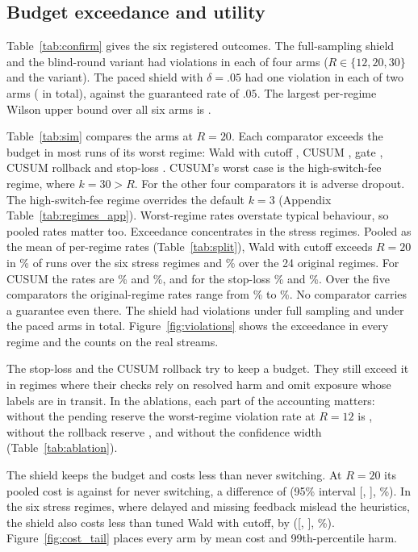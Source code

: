 \documentclass[10pt]{article}
\theoremstyle{plain}
\theoremstyle{definition}
\begin{document}
\subsection{Budget exceedance and utility}
Table~\ref{tab:confirm} gives the six registered outcomes. The full-sampling shield and the blind-round variant had \COneTotal{} violations in each of four arms ($R\in\{12,20,30\}$ and the variant). The paced shield with $\delta=.05$ had one violation in each of two arms (\CTwoTotal{} in total), against the guaranteed rate of $.05$. The largest per-regime Wilson upper bound over all six arms is \CTwoMaxHi.

Table~\ref{tab:sim} compares the arms at $R=20$. Each comparator exceeds the budget in most runs of its worst regime: Wald with cutoff \WorstWald, CUSUM \WorstCusum, gate \WorstGate, CUSUM rollback \WorstCusumRb and stop-loss \WorstStop. CUSUM's worst case is the high-switch-fee regime, where $k=30>R$. For the other four comparators it is adverse dropout. The high-switch-fee regime overrides the default $k=3$ (Appendix Table~\ref{tab:regimes_app}).
Worst-regime rates overstate typical behaviour, so pooled rates matter too. Exceedance concentrates in the stress regimes. Pooled as the mean of per-regime rates (Table~\ref{tab:split}), Wald with cutoff exceeds $R=20$ in \StressExceedWald\% of runs over the six stress regimes and \OrigExceedWald\% over the 24 original regimes. For CUSUM the rates are \StressExceedCusum\% and \OrigExceedCusum\%, and for the stop-loss \StressExceedStop\% and \OrigExceedStop\%. Over the five comparators the original-regime rates range from \OrigExceedMin\% to \OrigExceedMax\%. No comparator carries a guarantee even there. The shield had \COneTotal{} violations under full sampling and \CTwoTotal{} under the paced arms in total. Figure~\ref{fig:violations} shows the exceedance in every regime and the counts on the real streams.



The stop-loss and the CUSUM rollback try to keep a budget. They still exceed it in regimes where their checks rely on resolved harm and omit exposure whose labels are in transit. In the ablations, each part of the accounting matters: without the pending reserve the worst-regime violation rate at $R=12$ is \AblNoPending, without the rollback reserve \AblNoRollback, and without the confidence width \AblNoConf{} (Table~\ref{tab:ablation}).

The shield keeps the budget and costs less than never switching. At $R=20$ its pooled cost is \JFthreeTwenty{} against \JNever{} for never switching, a difference of \SimVsNeverDelta{} (95\% interval [\SimVsNeverLo, \SimVsNeverHi], \SimVsNeverPct\%). In the six stress regimes, where delayed and missing feedback mislead the heuristics, the shield also costs less than tuned Wald with cutoff, by \StressDelta{} ([\StressLo, \StressHi], \StressPct\%). Figure~\ref{fig:cost_tail} places every arm by mean cost and 99th-percentile harm.
\end{document}
